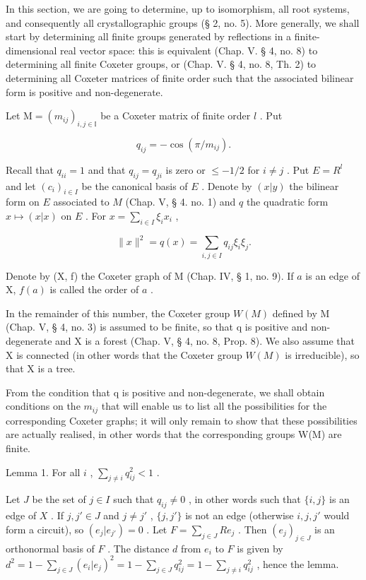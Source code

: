 In this section, we are going to determine, up to isomorphism, all root systems, and consequently all crystallographic groups (§ 2, no. 5). More generally, we shall start by determining all finite groups generated by reflections in a finite-dimensional real vector space: this is equivalent (Chap. V. § 4, no. 8) to determining all finite Coxeter groups, or (Chap. V. § 4, no. 8, Th. 2) to determining all Coxeter matrices of finite order such that the associated bilinear form is positive and non-degenerate.

Let \(\mathrm{M} = (m_{ij})_{i,j\in \mathbb{I}}\) be a Coxeter matrix of finite order \(l\) . Put

\[
q _ {i j} = - \cos (\pi / m _ {i j}).
\]

Recall that \(q_{ii} = 1\) and that \(q_{ij} = q_{ji}\) is zero or \(\leqslant -1/2\) for \(i \neq j\) . Put \(E = R^l\) and let \((c_i)_{i \in I}\) be the canonical basis of \(E\) . Denote by \((x|y)\) the bilinear form on \(E\) associated to \(M\) (Chap. V, § 4. no. 1) and \(q\) the quadratic form \(x \mapsto (x|x)\) on \(E\) . For \(x = \sum_{i \in I} \xi_i x_i\) ,

\[
\| x \| ^ {2} = q (x) = \sum_ {i, j \in I} q _ {i j} \xi_ {i} \xi_ {j}.
\]

Denote by (X, f) the Coxeter graph of M (Chap. IV, § 1, no. 9). If \(a\) is an edge of X, \(f(a)\) is called the order of \(a\) .

In the remainder of this number, the Coxeter group \(W(M)\) defined by M (Chap. V, § 4, no. 3) is assumed to be finite, so that q is positive and non-degenerate and X is a forest (Chap. V, § 4, no. 8, Prop. 8). We also assume that X is connected (in other words that the Coxeter group \(W(M)\) is irreducible), so that X is a tree.

From the condition that q is positive and non-degenerate, we shall obtain conditions on the \(m_{ij}\) that will enable us to list all the possibilities for the corresponding Coxeter graphs; it will only remain to show that these possibilities are actually realised, in other words that the corresponding groups W(M) are finite.

Lemma 1. For all \(i\) , \(\sum_{j \neq i} q_{ij}^2 < 1\) .

Let \(J\) be the set of \(j \in I\) such that \(q_{ij} \neq 0\) , in other words such that \(\{i, j\}\) is an edge of \(X\) . If \(j, j' \in J\) and \(j \neq j'\) , \(\{j, j'\}\) is not an edge (otherwise \(i, j, j'\) would form a circuit), so \((e_j | e_{j'}) = 0\) . Let \(F = \sum_{j \in J} R e_j\) . Then \((e_j)_{j \in J}\) is an orthonormal basis of \(F\) . The distance \(d\) from \(e_i\) to \(F\) is given by \(d^2 = 1 - \sum_{j \in J} (e_i | e_j)^2 = 1 - \sum_{j \in J} q_{ij}^2 = 1 - \sum_{j \neq i} q_{ij}^2\) , hence the lemma.

